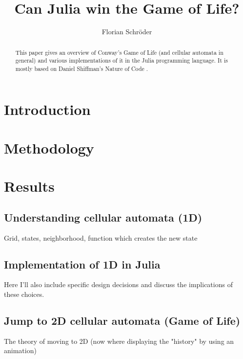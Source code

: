 \documentclass[a4paper,12pt]{llncs}
\numberwithin{equation}{section}
\begin{document}

%
\author{Florian Schröder}
%
\title{Can Julia win the Game of Life?}
%
%
\maketitle              %
\thispagestyle{empty}
%
%
\begin{abstract}
  This paper gives an overview of Conway's Game of Life (and cellular automata in general) and various implementations of it in the Julia programming language.
  It is mostly based on Daniel Shiffman's Nature of Code \cite{NOC}.
\end{abstract}


\section{Introduction}

\section{Methodology}


\section{Results}
\subsection{Understanding cellular automata (1D)}
Grid, states, neighborhood, function which creates the new state
\subsection{Implementation of 1D in Julia}
Here I'll also include specific design decisions and discuss the implications of these choices.
\subsection{Jump to 2D cellular automata (Game of Life)}
The theory of moving to 2D (now where displaying the "history" by using an animation)
\end{document}
